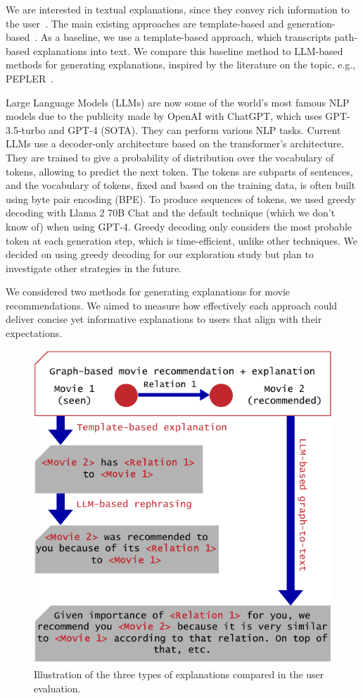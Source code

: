 We are interested in textual explanations, since they convey rich information to the user~\cite{Tintarev2015}. The main existing approaches are template-based and generation-based~\cite{Zhang2020}. As a baseline, we use a template-based approach, which transcripts path-based explanations into text. We compare this baseline method to LLM-based methods for generating explanations, inspired by the literature on the topic, e.g., PEPLER~\cite{Li2023PersonalizedPromptLearningExplainableRecommendation}.


Large Language Models (LLMs) are now some of the world's most famous NLP models due to the publicity made by OpenAI with ChatGPT, which uses GPT-3.5-turbo and GPT-4 (SOTA). They can perform various NLP tasks. Current LLMs use a decoder-only architecture based on the transformer's architecture\cite{yangHarnessingPowerLLMs2023a}. They are trained to give a probability of distribution over the vocabulary of tokens, allowing to predict the next token. %
The tokens are subparts of sentences, and the vocabulary of tokens, fixed and based on the training data, is often built using byte pair encoding (BPE)\cite{radfordImprovingLanguageUnderstanding, touvronLlamaOpenFoundation2023}. To produce sequences of tokens, we used greedy decoding with Llama 2 70B Chat and the default technique (which we don't know of) when using GPT-4. Greedy decoding only considers the most probable token at each generation step, which is time-efficient, unlike other techniques. We decided on using greedy decoding for our exploration study but plan to investigate other strategies in the future.


We considered two methods for generating explanations for movie recommendations. We aimed to measure how effectively each approach could deliver concise yet informative explanations to users that align with their expectations.

\begin{figure}[!ht]
    \centering
    \includegraphics[width=0.6\linewidth]{images/Example.pdf}
    \caption{Illustration of the three types of explanations compared in the user evaluation.}
    \label{fig:Example}
\end{figure}

